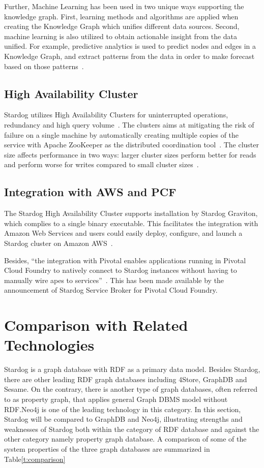 		Further, Machine Learning has been used in two unique ways 
		supporting the knowledge graph. First, learning methods and algorithms 
		are applied when creating  the Knowledge Graph which unifies different 
		data sources. Second,  machine learning is also utilized to obtain 
		actionable insight from the data unified. For example, predictive 
		analytics is used to predict nodes and edges in a Knowledge Graph, and 
		extract patterns from the data in order to make forecast based on those 
		patterns~\cite{hid-sp18-405-blog-stardog-ml}.


	\subsection{High Availability Cluster}
		Stardog utilizes High Availability Clusters for uninterrupted operations, 
		redundancy and high query 
		volume~\cite{hid-sp18-405-www-stardog-docs}. 
		The clusters aims at mitigating the risk of failure on a single machine by 
		automatically creating multiple copies of the service with Apache 
		ZooKeeper as the distributed coordination 
		tool~\cite{hid-sp18-405-www-stardog-predictiveanalyticstoday}. The 
		cluster size affects performance in two ways: larger cluster sizes 
		perform better for reads and perform worse for writes compared to 
		small cluster sizes~\cite{hid-sp18-405-www-stardog-docs}. 

	\subsection{Integration with AWS and PCF}
		The Stardog High Availability Cluster supports installation by Stardog 
		Graviton, which complies to a single binary executable. This facilitates 
		the integration with Amazon Web Services and users could easily 
		deploy, configure, and launch a Stardog cluster on Amazon 
		AWS~\cite{hid-sp18-405-blog-stardog-aws}. 
		
		Besides, ``the integration with Pivotal enables applications running in 
		Pivotal Cloud Foundry to natively connect to Stardog instances without 
		having to manually wire apes to 
		services''~\cite{hid-sp18-405-blog-stardog-pcf}. This has been made 
		available by the announcement of Stardog Service Broker for Pivotal 
		Cloud Foundry.

\section{Comparison with Related Technologies}
\label{s:comp}
	Stardog is a graph database with RDF as a primary data model. Besides 
	Stardog, there are other leading RDF graph databases including 4Store, 
	GraphDB and Sesame. On the contrary, there is another type of graph 
	databases, often referred to as property graph, that applies general Graph 
	DBMS model without RDF.\@ Neo4j is one of the leading technology in this 
	category. In this section, Stardog will be compared to GraphDB and Neo4j, 
	illustrating strengths and weaknesses of Stardog both within the category 
	of RDF database and against the other category namely property graph 
	database. A comparison of some of the system properties of the three 
	graph databases are summarized in 
	Table\ref{t:comparison}

